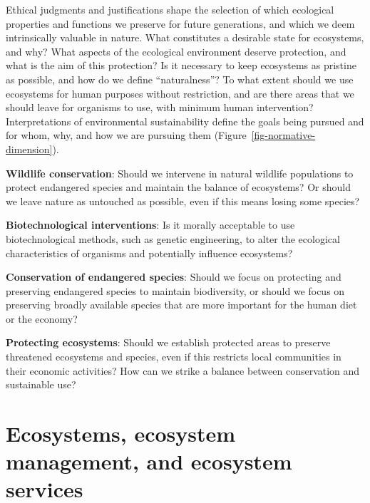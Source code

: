 \documentclass[
  a4paper,
  DIV=11,
  numbers=noendperiod,
  oneside,
  openany]{scrreprt}
\begin{document}
Ethical judgments and justifications shape the selection of which
ecological properties and functions we preserve for future generations,
and which we deem intrinsically valuable in nature. What constitutes a
desirable state for ecosystems, and why? What aspects of the ecological
environment deserve protection, and what is the aim of this protection?
Is it necessary to keep ecosystems as pristine as possible, and how do
we define ``naturalness''? To what extent should we use ecosystems for
human purposes without restriction, and are there areas that we should
leave for organisms to use, with minimum human intervention?
Interpretations of environmental sustainability define the goals being
pursued and for whom, why, and how we are pursuing them
(Figure~\ref{fig-normative-dimension}).

\begin{tcolorbox}[enhanced jigsaw, arc=.35mm, bottomrule=.15mm, bottomtitle=1mm, breakable, colback=white, colbacktitle=quarto-callout-tip-color!10!white, colframe=quarto-callout-tip-color-frame, coltitle=black, left=2mm, leftrule=.75mm, opacityback=0, opacitybacktitle=0.6, rightrule=.15mm, title={Specific examples of ethical assessments in the context of environmental
sustainability}, titlerule=0mm, toprule=.15mm, toptitle=1mm]

\textbf{Wildlife conservation}: Should we intervene in natural wildlife
populations to protect endangered species and maintain the balance of
ecosystems? Or should we leave nature as untouched as possible, even if
this means losing some species?

\textbf{Biotechnological interventions}: Is it morally acceptable to use
biotechnological methods, such as genetic engineering, to alter the
ecological characteristics of organisms and potentially influence
ecosystems?

\textbf{Conservation of endangered species}: Should we focus on
protecting and preserving endangered species to maintain biodiversity,
or should we focus on preserving broadly available species that are more
important for the human diet or the economy?

\textbf{Protecting ecosystems}: Should we establish protected areas to
preserve threatened ecosystems and species, even if this restricts local
communities in their economic activities? How can we strike a balance
between conservation and sustainable use?

\end{tcolorbox}

\section{Ecosystems, ecosystem management, and ecosystem
services}\label{ecosystems-ecosystem-management-and-ecosystem-services}
\end{document}
